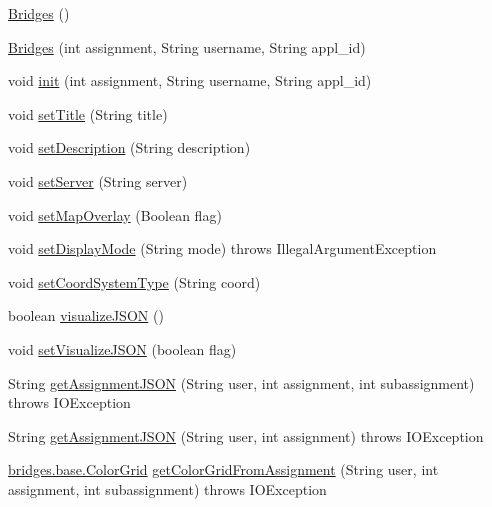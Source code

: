 \begin{DoxyCompactItemize}
\item 
\mbox{\hyperlink{classbridges_1_1connect_1_1_bridges_a42f0592841a829f93453506c78951b1f}{Bridges}} ()
\item 
\mbox{\hyperlink{classbridges_1_1connect_1_1_bridges_a4c47eb7cbb94c5810dc38c38760db872}{Bridges}} (int assignment, String username, String appl\+\_\+id)
\item 
void \mbox{\hyperlink{classbridges_1_1connect_1_1_bridges_a87aa73367a43cfc8b3ae5e4926ea4895}{init}} (int assignment, String username, String appl\+\_\+id)
\item 
void \mbox{\hyperlink{classbridges_1_1connect_1_1_bridges_aed3752ee6318a48dff271d9a9e2a8fcc}{set\+Title}} (String title)
\item 
void \mbox{\hyperlink{classbridges_1_1connect_1_1_bridges_a50d1d5aa64d312393b63d1be854e34a2}{set\+Description}} (String description)
\item 
void \mbox{\hyperlink{classbridges_1_1connect_1_1_bridges_ab43e412448e1dfc340e58c407519a576}{set\+Server}} (String server)
\item 
void \mbox{\hyperlink{classbridges_1_1connect_1_1_bridges_a4af383ba2f114ad7bd4e08eb44096973}{set\+Map\+Overlay}} (Boolean flag)
\item 
void \mbox{\hyperlink{classbridges_1_1connect_1_1_bridges_aaa1a44a689daa26a841d0e8d31839861}{set\+Display\+Mode}} (String mode)  throws Illegal\+Argument\+Exception 
\item 
void \mbox{\hyperlink{classbridges_1_1connect_1_1_bridges_ade4a9c43e2b608e6b3dc774b73f95749}{set\+Coord\+System\+Type}} (String coord)
\item 
boolean \mbox{\hyperlink{classbridges_1_1connect_1_1_bridges_afd3c63780396e92c94c923037385b31d}{visualize\+J\+S\+ON}} ()
\item 
void \mbox{\hyperlink{classbridges_1_1connect_1_1_bridges_aa502aa32a9ac482da9c8455c6810b64d}{set\+Visualize\+J\+S\+ON}} (boolean flag)
\item 
String \mbox{\hyperlink{classbridges_1_1connect_1_1_bridges_adcecf323f00525d1bcbfa1d9f0c9bcd5}{get\+Assignment\+J\+S\+ON}} (String user, int assignment, int subassignment)  throws I\+O\+Exception 
\item 
String \mbox{\hyperlink{classbridges_1_1connect_1_1_bridges_afc50484079d67ca3e1fe181c25ffc848}{get\+Assignment\+J\+S\+ON}} (String user, int assignment)  throws I\+O\+Exception 
\item 
\mbox{\hyperlink{classbridges_1_1base_1_1_color_grid}{bridges.\+base.\+Color\+Grid}} \mbox{\hyperlink{classbridges_1_1connect_1_1_bridges_ad7da1801d21fb94df13b90e96864e041}{get\+Color\+Grid\+From\+Assignment}} (String user, int assignment, int subassignment)  throws I\+O\+Exception 

\end{DoxyCompactItemize}
